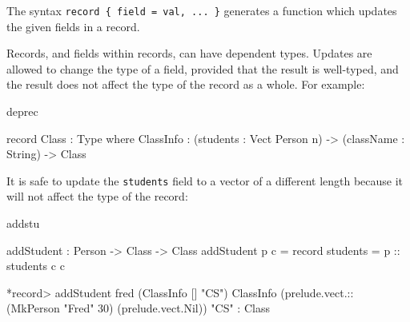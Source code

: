 \noindent
The syntax \texttt{record \{ field = val, ... \}} generates a function which updates
the given fields in a record. 

Records, and fields within records, can have dependent types.
Updates are allowed to change the type of a field,
provided that the result is well-typed, and the result does not affect the type of
the record as a whole. For example:

\begin{SaveVerbatim}{deprec}

record Class : Type where
    ClassInfo : (students : Vect Person n) ->
                (className : String) ->
                Class

\end{SaveVerbatim}

\noindent
It is safe to update the \texttt{students} field to a vector of a different length
because it will not affect the type of the record:

\begin{SaveVerbatim}{addstu}

addStudent : Person -> Class -> Class
addStudent p c = record { students = p :: students c } c

*record> addStudent fred (ClassInfo [] "CS")
ClassInfo (prelude.vect.:: (MkPerson "Fred" 30) (prelude.vect.Nil)) "CS" 
  : Class

\end{SaveVerbatim}

